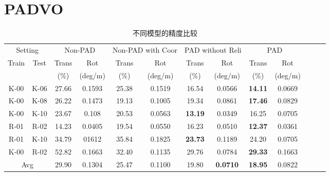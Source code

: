 \section{PADVO}
\begin{table*}[!htbp]
    \caption{不同模型的精度比较}
    \begin{center}
    \begin{tabular}{c c c c c c c c c c c c c }
    \toprule
    \multicolumn{2}{c}{Setting}   &\multicolumn{2}{c}{Non-PAD} &\multicolumn{2}{c}{Non-PAD with Coor} & \multicolumn{2}{c}{PAD without Reli}& \multicolumn{2}{c}{PAD}\\
    \cline{3-4}  \cline{5-6}  \cline{7-8} \cline{9-10} 
    \multirow{2}{*}{Train} &\multirow{2}{*}{Test}  & Trans & Rot  & Trans & Rot &Trans & Rot& Trans & Rot\\ 
     && (\%) & (deg/m)  & (\%) & (deg/m)& (\%) & (deg/m) & (\%) & (deg/m)\\
    \midrule
      K-00& K-06   &27.66&0.1593&25.38&0.1519&16.54&0.0566&\textbf{14.11}& 0.0669 \\
      K-00& K-08   &26.22&0.1473&19.13&0.1005&19.34&0.0861&\textbf{17.46}& 0.0829 \\
      K-00& K-10   &23.67&0.108&20.53&0.0563&\textbf{13.19}&0.0349&16.25& 0.0705 \\
      R-01& R-02   &14.23&0.0405&19.54&0.0550&16.23&0.0510&\textbf{12.37}& 0.0361 \\
      R-01& K-10   &34.79&01612&35.84&0.1825&\textbf{23.73}&0.1189&24.20& 0.0705\\
      K-00& R-02   &52.82&0.1663&32.40&0.1135&29.76&0.0784&\textbf{29.33}& 0.1663\\
    \midrule
    \multicolumn{2}{c}{Avg} &29.90 & 0.1304& 25.47      &  0.1100  &  19.80 &\textbf{0.0710}& \textbf{18.95} & 0.0822\\
    \bottomrule
    \end{tabular}
    \end{center}
    \label{tab:model_compare}
    \end{table*}
    


